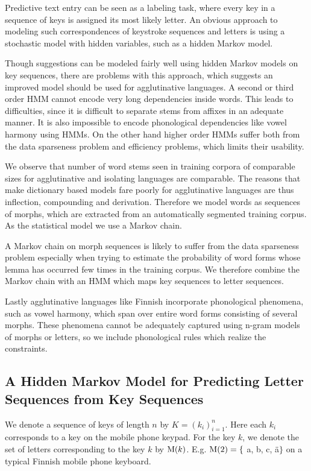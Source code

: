 \documentclass{llncs}
\begin{document}
Predictive text entry can be seen as a labeling task, where every key
in a sequence of keys is assigned its most likely letter. An obvious
approach to modeling such correspondences of keystroke sequences and
letters is using a stochastic model with hidden variables, such as a
hidden Markov model.

Though suggestions can be modeled fairly well using hidden Markov
models on key sequences, there are problems with this approach, which
suggests an improved model should be used for agglutinative
languages. A second or third order HMM cannot encode very long
dependencies inside words. This leads to difficulties, since it is
difficult to separate stems from affixes in an adequate manner. It is
also impossible to encode phonological dependencies like vowel harmony
using HMMs. On the other hand higher order HMMs suffer both from the
data sparseness problem and efficiency problems, which limits their
usability.

We observe that number of word stems seen in training corpora of
comparable sizes for agglutinative and isolating languages are
comparable. The reasons that make dictionary based models fare poorly
for agglutinative languages are thus inflection, compounding and
derivation. Therefore we model words as sequences of morphs, which are
extracted from an automatically segmented training corpus. As the
statistical model we use a Markov chain.

A Markov chain on morph sequences is likely to suffer from the data
sparseness problem especially when trying to estimate the probability
of word forms whose lemma has occurred few times in the training
corpus. We therefore combine the Markov chain with an HMM which maps
key sequences to letter sequences.

Lastly agglutinative languages like Finnish incorporate phonological
phenomena, such as vowel harmony, which span over entire word forms
consisting of several morphs. These phenomena cannot be adequately
captured using n-gram models of morphs or letters, so we include
phonological rules which realize the constraints.

\subsection{A Hidden Markov Model for Predicting Letter Sequences from Key Sequences}

We denote a sequence of keys of length $n$ by $K = (k_i)_{i=1}^{n}$. Here
each $k_i$ corresponds to a key on the mobile phone keypad. For the
key $k$, we denote the set of letters corresponding to the key $k$ by ${\rm
  M}(k)$. E.g. ${\rm M}(2) = \{$ a, b, c, \"{a}$\}$ on a typical
Finnish mobile phone keyboard.
\end{document}
